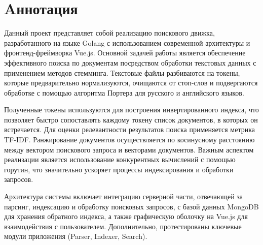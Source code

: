 \section*{Aннотация}


Данный проект представляет собой реализацию поискового движка, разработанного на языке Golang с использованием современной 
архитектуры и фронтенд-фреймворка Vue.js. Основной задачей работы является обеспечение эффективного поиска по документам 
посредством обработки текстовых данных с применением методов стемминга. Текстовые файлы разбиваются на токены, 
которые предварительно нормализуются, очищаются от стоп-слов и подвергаются обработке с помощью алгоритма 
Портера для русского и английского языков.

Полученные токены используются для построения инвертированного индекса, что позволяет быстро сопоставлять каждому токену список 
документов, в которых он встречается. Для оценки релевантности результатов поиска применяется метрика TF-IDF.
Ранжирование документов осуществляется по косинусному расстоянию между вектором поискового запроса и векторами
 документов. Важным аспектом реализации является использование конкурентных вычислений с помощью горутин, что значительно ускоряет
  процессы индексирования и обработки запросов.

Архитектура системы включает интеграцию серверной части, отвечающей за парсинг, индексацию и обработку поисковых запросов, с 
базой данных MongoDB для хранения обратного индекса, а также графическую оболочку на Vue.js для взаимодействия с 
пользователем. Дополнительно, протестированы ключевые модули приложения (Parser, Indexer, Search).